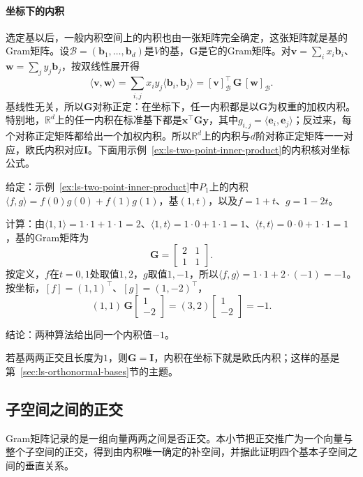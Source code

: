 \paragraph{坐标下的内积}
选定基以后，一般内积空间上的内积也由一张矩阵完全确定，这张矩阵就是基的Gram矩阵。设$\mathcal B=(\bm b_1,\ldots,\bm b_d)$是$V$的基，$\bm G$是它的Gram矩阵。对$\bm v=\sum_ix_i\bm b_i$、$\bm w=\sum_jy_j\bm b_j$，按双线性展开得
\[
 \langle\bm v,\bm w\rangle=\sum_{i,j}x_iy_j\langle\bm b_i,\bm b_j\rangle=[\bm v]_{\mathcal B}^\top\,\bm G\,[\bm w]_{\mathcal B}.
\]
基线性无关，所以$\bm G$对称正定：在坐标下，任一内积都是以$\bm G$为权重的加权内积。特别地，$\mathbb R^d$上的任一内积在标准基下都是$\bm x^\top\bm G\bm y$，其中$g_{i,j}=\langle\bm e_i,\bm e_j\rangle$；反过来，每个对称正定矩阵都给出一个加权内积。所以$\mathbb R^d$上的内积与$d$阶对称正定矩阵一一对应，欧氏内积对应$\bm I$。下面用示例~\ref{ex:ls-two-point-inner-product}的内积核对坐标公式。
\begin{example}[两点内积的坐标计算]
\label{ex:ls-two-point-inner-product-coordinates}
给定：示例~\ref{ex:ls-two-point-inner-product}中$P_1$上的内积$\langle f,g\rangle=f(0)g(0)+f(1)g(1)$，基$(1,t)$，以及$f=1+t$、$g=1-2t$。

计算：由$\langle1,1\rangle=1\cdot1+1\cdot1=2$、$\langle1,t\rangle=1\cdot0+1\cdot1=1$、$\langle t,t\rangle=0\cdot0+1\cdot1=1$，基的Gram矩阵为
\[
 \bm G=\begin{bmatrix}2&1\\1&1\end{bmatrix}.
\]
按定义，$f$在$t=0,1$处取值$1,2$，$g$取值$1,-1$，所以$\langle f,g\rangle=1\cdot1+2\cdot(-1)=-1$。按坐标，$[f]=(1,1)^\top$、$[g]=(1,-2)^\top$，
\[
 (1,1)\,\bm G\begin{bmatrix}1\\-2\end{bmatrix}=(3,2)\begin{bmatrix}1\\-2\end{bmatrix}=-1 .
\]

结论：两种算法给出同一个内积值$-1$。
\end{example}
若基两两正交且长度为$1$，则$\bm G=\bm I$，内积在坐标下就是欧氏内积；这样的基是第~\ref{sec:ls-orthonormal-bases}节的主题。

\subsection{子空间之间的正交}
\label{sec:ls-orthogonality}

Gram矩阵记录的是一组向量两两之间是否正交。本小节把正交推广为一个向量与整个子空间的正交，得到由内积唯一确定的补空间，并据此证明四个基本子空间之间的垂直关系。


